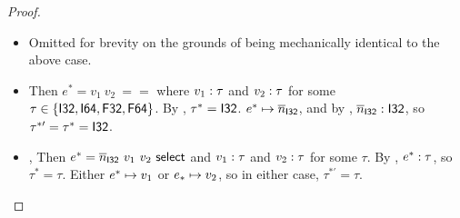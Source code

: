 \documentclass{article}
\begin{document}
\begin{proof}
\begin{itemize}
    \item {}
        Omitted for brevity on the grounds of being mechanically identical to the above case.
    
    \item {}
        Then $e^* = v_1~ v_2~ ==$ where $v_1 : \tau$ and $v_2 : \tau$ for some $\tau \in \{\mathsf{I32}, \mathsf{I64}, \mathsf{F32}, \mathsf{F64}\}$.
        By , $\tau^* = \mathsf{I32}$.
        $e^* \mapsto \overline{n}_{\mathsf{I32}}$, and by , $\overline{n}_{\mathsf{I32}} : \mathsf{I32}$, so $\tau^{*\prime} = \tau^* = \mathsf{I32}$.
    
    \item {}, 
        Then $e^* = \overline{n}_{\mathsf{I32}} ~ v_1 ~ v_2 ~ \mathsf{select}$ and $v_1 : \tau$ and $v_2 : \tau$ for some $\tau$.
        By , $e^* : \tau$, so $\tau^* = \tau$.
        Either $e^* \mapsto v_1$ or $e_* \mapsto v_2$, so in either case, $\tau^{*\prime} = \tau$.
\end{itemize}

\end{proof}
\end{document}
